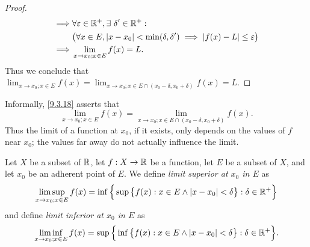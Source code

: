 \begin{proof}
\begin{align*}
    \implies & \forall \varepsilon \in \mathbb{R}^+, \exists\ \delta' \in \mathbb{R}^+ :                                                                             \\
             & \big(\forall x \in E, \left\lvert x - x_0\right\rvert < \min(\delta, \delta') \implies \left\lvert f(x) - L\right\rvert \leq \varepsilon\big)                             \\
    \implies & \lim_{x \to x_0 ; x \in E} f(x) = L.
  \end{align*}
  Thus we conclude that \(\lim_{x \to x_0 ; x \in E} f(x) = \lim_{x \to x_0 ; x \in E \cap (x_0 - \delta, x_0 + \delta)} f(x) = L\).
\end{proof}

\begin{note}
  Informally, \cref{9.3.18} asserts that
  \[
    \lim_{x \to x_0 ; x \in E} f(x) = \lim_{x \to x_0 ; x \in E \cap (x_0 - \delta, x_0 + \delta)} f(x).
  \]
  Thus the limit of a function at \(x_0\), if it exists, only depends on the values of \(f\) near \(x_0\);
  the values far away do not actually influence the limit.
\end{note}

\begin{ac}\label{ac:9.3.1}
  Let \(X\) be a subset of \(\mathbb{R}\), let \(f : X \to \mathbb{R}\) be a function, let \(E\) be a subset of \(X\), and let \(x_0\) be an adherent point of \(E\).
  We define \emph{limit superior at \(x_0\) in \(E\)} as
  \[
    \limsup_{x \to x_0 ; x \in E} f(x) = \inf\Big\{\sup\big\{f(x) : x \in E \land \left\lvert x - x_0\right\rvert < \delta\big\} : \delta \in \mathbb{R}^+\Big\}
  \]
  and define \emph{limit inferior at \(x_0\) in \(E\)} as
  \[
    \liminf_{x \to x_0 ; x \in E} f(x) = \sup\Big\{\inf\big\{f(x) : x \in E \land \left\lvert x - x_0\right\rvert < \delta\big\} : \delta \in \mathbb{R}^+\Big\}.
  \]
\end{ac}

